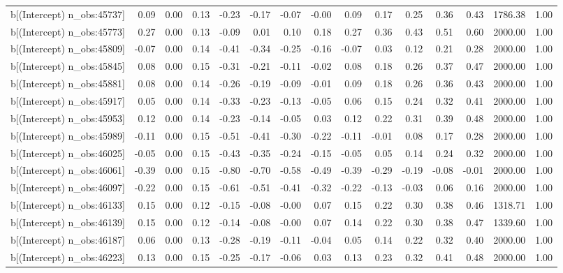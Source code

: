 \begin{table}[ht]
\begin{tabular}{rrrrrrrrrrrrrrr}
  b[(Intercept) n\_obs:45737] & 0.09 & 0.00 & 0.13 & -0.23 & -0.17 & -0.07 & -0.00 & 0.09 & 0.17 & 0.25 & 0.36 & 0.43 & 1786.38 & 1.00 \\ 
  b[(Intercept) n\_obs:45773] & 0.27 & 0.00 & 0.13 & -0.09 & 0.01 & 0.10 & 0.18 & 0.27 & 0.36 & 0.43 & 0.51 & 0.60 & 2000.00 & 1.00 \\ 
  b[(Intercept) n\_obs:45809] & -0.07 & 0.00 & 0.14 & -0.41 & -0.34 & -0.25 & -0.16 & -0.07 & 0.03 & 0.12 & 0.21 & 0.28 & 2000.00 & 1.00 \\ 
  b[(Intercept) n\_obs:45845] & 0.08 & 0.00 & 0.15 & -0.31 & -0.21 & -0.11 & -0.02 & 0.08 & 0.18 & 0.26 & 0.37 & 0.47 & 2000.00 & 1.00 \\ 
  b[(Intercept) n\_obs:45881] & 0.08 & 0.00 & 0.14 & -0.26 & -0.19 & -0.09 & -0.01 & 0.09 & 0.18 & 0.26 & 0.36 & 0.43 & 2000.00 & 1.00 \\ 
  b[(Intercept) n\_obs:45917] & 0.05 & 0.00 & 0.14 & -0.33 & -0.23 & -0.13 & -0.05 & 0.06 & 0.15 & 0.24 & 0.32 & 0.41 & 2000.00 & 1.00 \\ 
  b[(Intercept) n\_obs:45953] & 0.12 & 0.00 & 0.14 & -0.23 & -0.14 & -0.05 & 0.03 & 0.12 & 0.22 & 0.31 & 0.39 & 0.48 & 2000.00 & 1.00 \\ 
  b[(Intercept) n\_obs:45989] & -0.11 & 0.00 & 0.15 & -0.51 & -0.41 & -0.30 & -0.22 & -0.11 & -0.01 & 0.08 & 0.17 & 0.28 & 2000.00 & 1.00 \\ 
  b[(Intercept) n\_obs:46025] & -0.05 & 0.00 & 0.15 & -0.43 & -0.35 & -0.24 & -0.15 & -0.05 & 0.05 & 0.14 & 0.24 & 0.32 & 2000.00 & 1.00 \\ 
  b[(Intercept) n\_obs:46061] & -0.39 & 0.00 & 0.15 & -0.80 & -0.70 & -0.58 & -0.49 & -0.39 & -0.29 & -0.19 & -0.08 & -0.01 & 2000.00 & 1.00 \\ 
  b[(Intercept) n\_obs:46097] & -0.22 & 0.00 & 0.15 & -0.61 & -0.51 & -0.41 & -0.32 & -0.22 & -0.13 & -0.03 & 0.06 & 0.16 & 2000.00 & 1.00 \\ 
  b[(Intercept) n\_obs:46133] & 0.15 & 0.00 & 0.12 & -0.15 & -0.08 & -0.00 & 0.07 & 0.15 & 0.22 & 0.30 & 0.38 & 0.46 & 1318.71 & 1.00 \\ 
  b[(Intercept) n\_obs:46139] & 0.15 & 0.00 & 0.12 & -0.14 & -0.08 & -0.00 & 0.07 & 0.14 & 0.22 & 0.30 & 0.38 & 0.47 & 1339.60 & 1.00 \\ 
  b[(Intercept) n\_obs:46187] & 0.06 & 0.00 & 0.13 & -0.28 & -0.19 & -0.11 & -0.04 & 0.05 & 0.14 & 0.22 & 0.32 & 0.40 & 2000.00 & 1.00 \\ 
  b[(Intercept) n\_obs:46223] & 0.13 & 0.00 & 0.15 & -0.25 & -0.17 & -0.06 & 0.03 & 0.13 & 0.23 & 0.32 & 0.41 & 0.48 & 2000.00 & 1.00 \\ 

\end{tabular}
\end{table}
